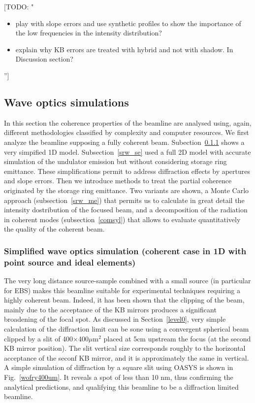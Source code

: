 \documentclass{iucr}              %
\newcommand{\todo}[1]{{\color{red}[TODO: "#1'']}}
\begin{document}
\todo{
\begin{itemize}
 \item play with slope errors and use synthetic profiles to show the importance of the low frequencies in the intensity distribution?
 \item explain why KB errors are treated with hybrid and not with shadow. In Discussion section? 
\end{itemize}
}



\subsection{Wave optics simulations}
\label{level2}

In this section the coherence properties of the beamline are analysed using, again, different methodologies classified by complexity and computer resources. We first analyze the beamline supposing a fully coherent beam. Subection~\ref{wofry} shows a very simpified 1D model. Subsection~\ref{srw_se} used a full 2D model with accurate simulation of the undulator emission but without considering storage ring emittance. These simplifications permit to address diffraction effects by apertures and slope errors. Then we introduce methods to treat the partial coherence originated by the storage ring emittance. Two variants are shown, a Monte Carlo approach (subsection~\ref{srw_me}) that permits us to calculate in great detail the intensity dostribution of the focused beam, and a decomposition of the radiation in coherent modes (subsection~\ref{comsyl}) that allows to evaluate quantitatively the quality of the coherent beam.  


\subsubsection{Simplified wave optics simulation (coherent case in 1D with point source and ideal elements)}
\label{wofry}

The very long distance source-sample combined with a small source (in particular for EBS) makes this beamline suitable for experimental techniques requiring a highly coherent beam. Indeed, it has been shown that the clipping of the beam, mainly due to the acceptance of the KB mirrors produces a significant broadening of the focal spot.  As discussed in Section~\ref{level0}, very simple calculation of the diffraction limit can be sone using a convergent spherical beam clipped by a slit of 400$\times$400$ \mu$m$^2$ placed at 5cm upstream the focus (at the second KB mirror position). The slit vertical size corresponds roughly to the horizontal acceptance of the seconf KB mirror, and it is approximately the same in vertical. A simple simulation of diffraction by a square slit using OASYS is shown in Fig.~\ref{wofry400um}. It reveals a spot of less than 10 nm, thus confirming the analytical predictions, and qualifying this beamline to be a diffraction limited beamline.  
\end{document}
